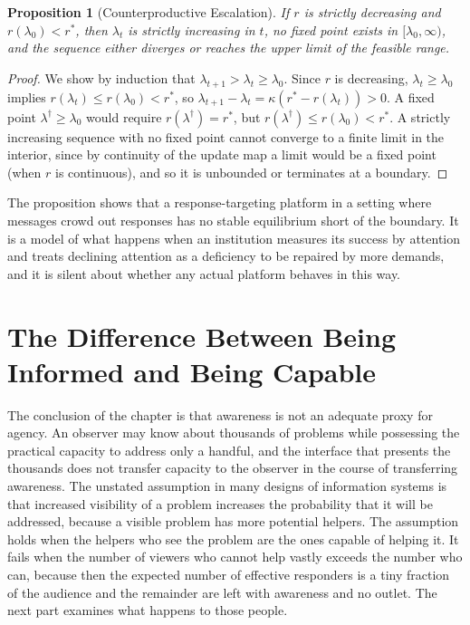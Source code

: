 \documentclass[11pt]{report}
\newtheorem{proposition}[theorem]{Proposition}
\theoremstyle{definition}
\theoremstyle{remark}
\begin{document}
\begin{proposition}[Counterproductive Escalation]\label{prop:escalate}
If $r$ is strictly decreasing and $r(\lambda_0)<r^\ast$, then $\lambda_t$ is strictly increasing in $t$, no fixed point exists in $[\lambda_0,\infty)$, and the sequence either diverges or reaches the upper limit of the feasible range.
\end{proposition}

\begin{proof}
We show by induction that $\lambda_{t+1}>\lambda_t\ge\lambda_0$. Since $r$ is decreasing, $\lambda_t\ge\lambda_0$ implies $r(\lambda_t)\le r(\lambda_0)<r^\ast$, so $\lambda_{t+1}-\lambda_t=\kappa(r^\ast-r(\lambda_t))>0$. A fixed point $\lambda^\dagger\ge\lambda_0$ would require $r(\lambda^\dagger)=r^\ast$, but $r(\lambda^\dagger)\le r(\lambda_0)<r^\ast$. A strictly increasing sequence with no fixed point cannot converge to a finite limit in the interior, since by continuity of the update map a limit would be a fixed point (when $r$ is continuous), and so it is unbounded or terminates at a boundary.
\end{proof}

The proposition shows that a response-targeting platform in a setting where messages crowd out responses has no stable equilibrium short of the boundary. It is a model of what happens when an institution measures its success by attention and treats declining attention as a deficiency to be repaired by more demands, and it is silent about whether any actual platform behaves in this way.

\section{The Difference Between Being Informed and Being Capable}

The conclusion of the chapter is that awareness is not an adequate proxy for agency. An observer may know about thousands of problems while possessing the practical capacity to address only a handful, and the interface that presents the thousands does not transfer capacity to the observer in the course of transferring awareness. The unstated assumption in many designs of information systems is that increased visibility of a problem increases the probability that it will be addressed, because a visible problem has more potential helpers. The assumption holds when the helpers who see the problem are the ones capable of helping it. It fails when the number of viewers who cannot help vastly exceeds the number who can, because then the expected number of effective responders is a tiny fraction of the audience and the remainder are left with awareness and no outlet. The next part examines what happens to those people.
\end{document}
